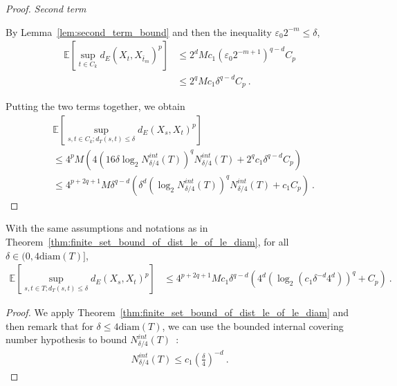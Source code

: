 \begin{proof}
\emph{Second term}

By Lemma~\ref{lem:second_term_bound} and then the inequality $\varepsilon_0 2^{-m} \le \delta$,
\begin{align*}
  \mathbb{E} \left[\sup_{t \in C_k} d_E(X_t, X_{\bar{t}_m})^p \right]
  &\le 2^d M c_1 (\varepsilon_0 2^{-m+1})^{q - d} C_p
  \\
  &\le 2^q M c_1 \delta^{q - d} C_p
  \: .
\end{align*}

Putting the two terms together, we obtain
\begin{align*}
  &\mathbb{E}\left[ \sup_{s, t \in C_k; d_T(s, t) \le \delta} d_E(X_s, X_t)^p \right]
  \\
  &\le 4^p M \left(4\left(16 \delta \log_2 N^{int}_{\delta/4}(T) \right)^q  N^{int}_{\delta/4}(T)
    + 2^q c_1 \delta^{q - d} C_p\right)
  \\
  &\le 4^{p+2q+1} M \delta^{q-d} \left(\delta^d \left(\log_2 N^{int}_{\delta/4}(T) \right)^q  N^{int}_{\delta/4}(T)
    + c_1 C_p\right)
  \: .
\end{align*}
\end{proof}


\begin{corollary}\label{cor:finite_set_bound_of_dist_le_of_le_diam_bis}
  \leanok
With the same assumptions and notations as in Theorem~\ref{thm:finite_set_bound_of_dist_le_of_le_diam}, for all $\delta \in (0, 4\mathrm{diam}(T)]$,
\begin{align*}
  \mathbb{E}\left[ \sup_{s, t \in T; d_T(s, t) \le \delta} d_E(X_s, X_t)^p \right]
  &\le 4^{p+2q+1} M c_1 \delta^{q-d} \left(4^d \left(\log_2 \left(c_1 \delta^{-d} 4^d \right) \right)^q
    + C_p\right)
  \: .
\end{align*}
\end{corollary}

\begin{proof}
We apply Theorem~\ref{thm:finite_set_bound_of_dist_le_of_le_diam} and then remark that for $\delta \le 4\mathrm{diam}(T)$, we can use the bounded internal covering number hypothesis to bound $N^{int}_{\delta/4}(T)$~:
\begin{align*}
  N^{int}_{\delta/4}(T) \le c_1 \left(\frac{\delta}{4}\right)^{-d} \: .
\end{align*}
\end{proof}


